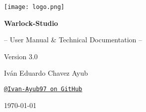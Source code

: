 \documentclass[11pt, a4paper]{article}
\begin{document}
\begin{titlepage}
    \begin{tcolorbox}[
        colback=WarlockDark,                    %
        colframe=WarlockGold,                   %
        sharp corners,                          %
        boxrule=1.5pt,                          %
        halign=center,                          %
        valign=center,                          %
        height=\dimexpr\textheight-1cm\relax    %
      ]
      \centering %

      \texttt{[image: logo.png]}\par %

      \vfill %

      \color{white} %

      {\Huge\bfseries Warlock-Studio\par}
      \vspace{0.7cm} %
      {\Large -- User Manual \& Technical Documentation --\par}
      \vspace{0.2cm}
      {\Large Version 3.0\par}

      \vfill %

      {\large Iván Eduardo Chavez Ayub\par}
      \href{https://github.com/Ivan-Ayub97}{\texttt{\color{WarlockGold}@Ivan-Ayub97 on GitHub}}\par %

      \vspace{1.5cm}

      {\large \today\par} %
    \end{tcolorbox}
    \thispagestyle{empty} %
\end{titlepage}


\pagestyle{fancy} %
\end{document}
